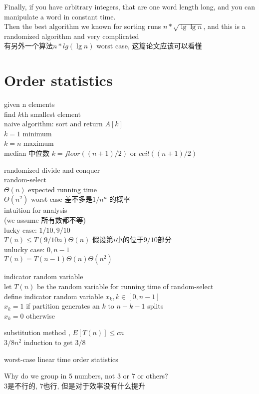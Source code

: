 \documentclass{article}
\begin{document}
Finally, if you have arbitrary integers, that are one word length long, and you can manipulate a word in constant time.\\
Then the best algorithm we known for sorting runs $n*\sqrt{\lg\lg n }$, and this is a randomized algorithm and very complicated\\
有另外一个算法$n*lg(\lg n )$ worst case, 这篇论文应该可以看懂

\section{Order statistics}
given n elements\\
find $k$th smallest element\\
naive algorithm: sort and return $A[k]$\\
$k=1$ minimum\\
$k=n$ maximum\\
median 中位数 $k=floor((n+1)/2)$ or $ceil((n+1)/2)$

randomized divide and conquer\\
random-select \\
$\Theta(n)$ expected running time\\
$\Theta(n^2)$ worst-case  差不多是$1/n^n$ 的概率\\
intuition for analysis\\
(we assume 所有数都不等)\\
lucky case: $1/10, 9/10$\\
$T(n) \leq T(9/10n)\Theta(n)$  假设第$i$小的位于$9/10$部分\\
unlucky case: $0, n-1$\\
$T(n)=T(n-1)\Theta(n)\Theta(n^2)$

indicator random variable\\
let $T(n)$  be the random variable for running time of random-select\\
define indicator random variable $x_k, k \in [0, n-1]$\\
$x_k = 1$	if partition generates an $k$ to $n-k-1$ splits \\
$x_k = 0$	otherwise

substitution method , $E[T(n)] \leq cn$\\
$3/8n^2$ induction to get $3/8$

worst-case linear time order statistics

Why do we group in $5$ numbers, not $3$ or $7$ or others?\\
$3$是不行的, $7$也行, 但是对于效率没有什么提升
\end{document}
